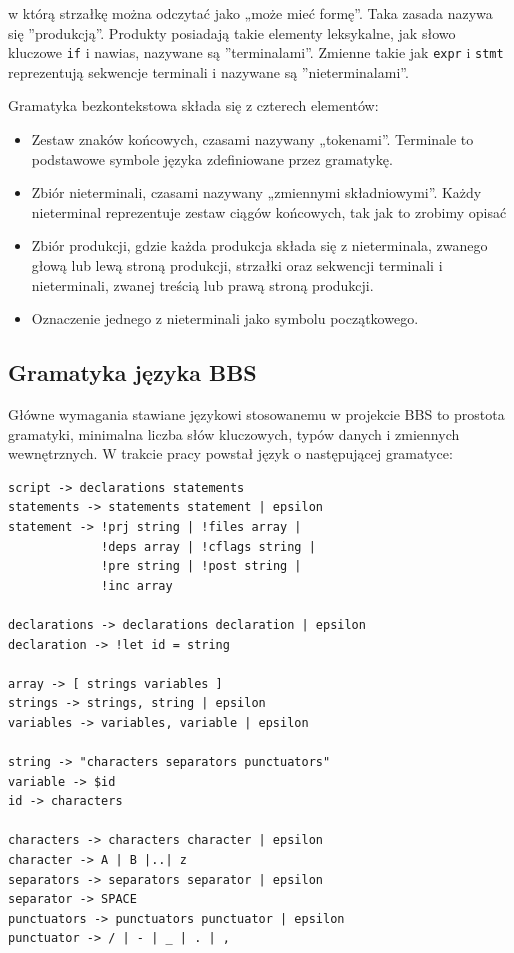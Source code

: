 w którą strzałkę można odczytać jako „może mieć formę”. Taka zasada nazywa się ''produkcją''. Produkty posiadają takie elementy leksykalne, jak słowo kluczowe \texttt{if} i nawias, nazywane są ''terminalami''. Zmienne takie jak \texttt{expr} i \texttt{stmt} reprezentują sekwencje terminali i nazywane są ''nieterminalami''.

Gramatyka bezkontekstowa składa się z czterech elementów:
\begin{itemize}
    \item Zestaw znaków końcowych, czasami nazywany „tokenami”. Terminale to podstawowe symbole języka zdefiniowane przez gramatykę.
    \item Zbiór nieterminali, czasami nazywany „zmiennymi składniowymi”. Każdy nieterminal reprezentuje zestaw ciągów końcowych, tak jak to zrobimy opisać
    \item Zbiór produkcji, gdzie każda produkcja składa się z nieterminala, zwanego głową lub lewą stroną produkcji, strzałki oraz sekwencji terminali i nieterminali, zwanej treścią lub prawą stroną produkcji.
    \item Oznaczenie jednego z nieterminali jako symbolu początkowego.
\end{itemize}

\subsection{Gramatyka języka BBS}

Główne wymagania stawiane językowi stosowanemu w projekcie BBS to prostota gramatyki, minimalna liczba słów kluczowych, typów danych i zmiennych wewnętrznych. W trakcie pracy powstał język o następującej gramatyce:

\begin{lstlisting}[label=list:grammar,caption=Gramatyka języka projektu BBS,basicstyle=\footnotesize\ttfamily]
script -> declarations statements
statements -> statements statement | epsilon
statement -> !prj string | !files array | 
			 !deps array | !cflags string | 
			 !pre string | !post string | 
			 !inc array

declarations -> declarations declaration | epsilon
declaration -> !let id = string

array -> [ strings variables ]
strings -> strings, string | epsilon
variables -> variables, variable | epsilon

string -> "characters separators punctuators"
variable -> $id
id -> characters

characters -> characters character | epsilon
character -> A | B |..| z
separators -> separators separator | epsilon
separator -> SPACE
punctuators -> punctuators punctuator | epsilon
punctuator -> / | - | _ | . | ,
\end{lstlisting}

